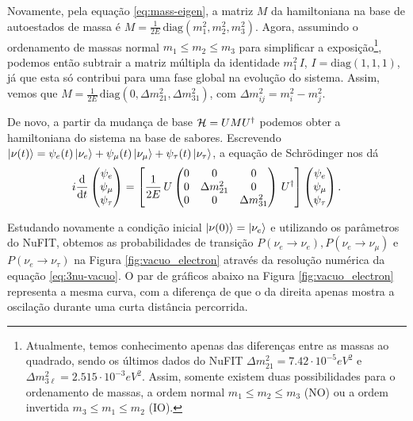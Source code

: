 \documentclass[12pt]{report}
\begin{document}
Novamente, pela equação \ref{eq:mass-eigen}, a matriz $M$ da hamiltoniana na base de autoestados de massa é $M = \frac{1}{2E} \, \text{diag}(m_1^2, m_2^2, m_3^2)$. Agora, assumindo o ordenamento de massas normal $m_1 \leq m_2 \leq m_3$ para simplificar a exposição\footnote{Atualmente, temos conhecimento apenas das diferenças entre as massas ao quadrado, sendo os últimos dados do NuFIT $\Delta m_{21}^2 = 7.42 \cdot 10^{-5} \unit{eV^2}$ e $\Delta m_{3\ell}^2 = 2.515 \cdot 10^{-3} \unit{eV^2}$. Assim, somente existem duas possibilidades para o ordenamento de massas, a ordem normal $m_1 \leq m_2 \leq m_3$ (NO) ou a ordem invertida $m_3 \leq m_1 \leq m_2$ (IO).}, podemos então subtrair a matriz múltipla da identidade $m_1^2 \, I$, $I = \text{diag}(1,1,1)$, já que esta só contribui para uma fase global na evolução do sistema. Assim, vemos que $M = \frac{1}{2E} \, \text{diag}(0, \Delta m_{21}^2, \Delta m_{31}^2)$, com $\Delta m_{ij}^2 = m_i^2 - m_j^2$.

De novo, a partir da mudança de base $\mathcal{H} = U M U^\dagger$ podemos obter a hamiltoniana do sistema na base de sabores. Escrevendo $\ket{\nu(t)} = \psi_e(t) \ket{\nu_e} + \psi_\mu(t) \ket{\nu_\mu} + \psi_\tau(t) \ket{\nu_\tau}$, a equação de Schrödinger nos dá
\begin{equation} \label{eq:3nu-vacuo}
i \dv{t}
\begin{pmatrix}
\psi_e \\ \psi_\mu \\ \psi_\tau
\end{pmatrix}
=
\qty[ \frac{1}{2E} \, U
\begin{pmatrix}
0 & 0 & 0 \\
0 & \Delta m_{21}^2 & 0 \\
0 & 0 & \Delta m_{31}^2 \\
\end{pmatrix}
\, U^\dagger ]
\begin{pmatrix}
\psi_e \\ \psi_\mu \\ \psi_\tau
\end{pmatrix}.
\end{equation}

Estudando novamente a condição inicial $\ket{\nu(0)} = \ket{\nu_e}$ e utilizando os parâmetros do NuFIT, obtemos as probabilidades de transição $P(\nu_e \to \nu_e), P(\nu_e \to \nu_\mu)$ e $P(\nu_e \to \nu_\tau)$ na Figura \ref{fig:vacuo_electron} através da resolução numérica da equação \ref{eq:3nu-vacuo}. O par de gráficos abaixo na Figura \ref{fig:vacuo_electron} representa a mesma curva, com a diferença de que o da direita apenas mostra a oscilação durante uma curta distância percorrida.
\end{document}
